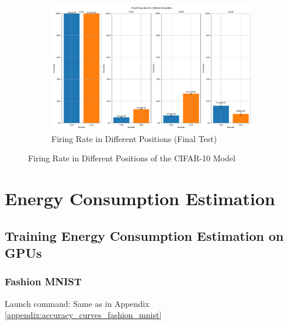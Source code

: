 \begin{figure}[H]
\begin{subfigure}[H]{\textwidth}
                \includegraphics[width=\textwidth]{../firerate/CIFAR10/plots/cifar10_final_firerate.pdf}
                \caption{Firing Rate in Different Positions (Final Test)}
            \end{subfigure}
            \caption{Firing Rate in Different Positions of the CIFAR-10 Model}
        \end{figure}


\chapter{Energy Consumption Estimation}
\label{appendix:energy}

\section{Training Energy Consumption Estimation on GPUs}
\label{appendix:energy_gpu}

    \subsection{Fashion MNIST}
    \label{appendix:energy_gpu_fashion_mnist}
        Launch command: Same as in Appendix \ref{appendix:accuracy_curves_fashion_mnist}

